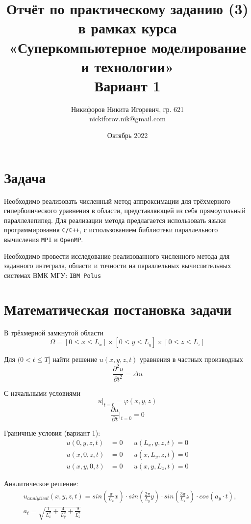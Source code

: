 \documentclass{article}
\title{Отчёт по практическому заданию (3) в рамках курса\\«Суперкомпьютерное моделирование и технологии»\\Вариант 1}
\author{Никифоров Никита Игоревич, гр. 621\\nickiforov.nik@gmail.com}
\date{Октябрь 2022}
\begin{document}
\maketitle
\newpage
\section{Задача}
    Необходимо реализовать численный метод аппроксимации для трёхмерного 
    гиперболического уравнения в области, представляющей из себя прямоугольный параллелепипед.  
    Для реализации метода предлагается использовать языки программирования 
    {\tt C/C++}, с использованием библиотеки параллельного вычисления {\tt MPI} и {\tt OpenMP}.

    Необходимо провести исследование реализованного численного метода для
    заданного интеграла, области и точности 
    на параллельных вычислительных системах ВМК МГУ: {\tt IBM Polus}
\section{Математическая постановка задачи}
В трёхмерной замкнутой области
\begin{equation*}
    \Omega = [0 \le x \le L_x] \times [0 \le y \le L_y] \times [0 \le z \le L_z]
\end{equation*}
 
Для $(0 < t \le T]$ найти решение $u(x, y, z, t)$ уравнения в частных производных
\begin{equation}
    \frac{\partial^2 u}{\partial t ^ 2} = \Delta u
\end{equation}
 
С начальными условиями 
\begin{equation}
    u \rvert_{t = 0} = \varphi (x, y, z)
    \label{eq:phi}
\end{equation}
\begin{equation}
    \frac{\partial u}{\partial t} \bigg \rvert_{t=0} = 0
\end{equation}
 
Граничные условия (вариант 1):
\begin{align}
    u(0, y, z, t) &= 0 && u(L_x, y, z, t) = 0\\ 
    u(x, 0, z, t) &= 0 && u(x, L_y, z, t) = 0\\
    u(x, y, 0, t) &= 0 && u(x, y, L_z, t) = 0
\end{align}
 
Аналитическое решение:
\begin{align}
    & u_{analytical}(x, y, z, t) = sin(\frac{\pi}{L_x}x) \cdot sin(\frac{2\pi}{L_y}y) \cdot sin(\frac{3\pi}{L_z}z) \cdot cos(a_y \cdot t), \\
    & a_t = \sqrt{\frac{1}{L_x^2} + \frac{4}{L_y^2} + \frac{9}{L_z^2}}
\end{align}
 
\end{document}
